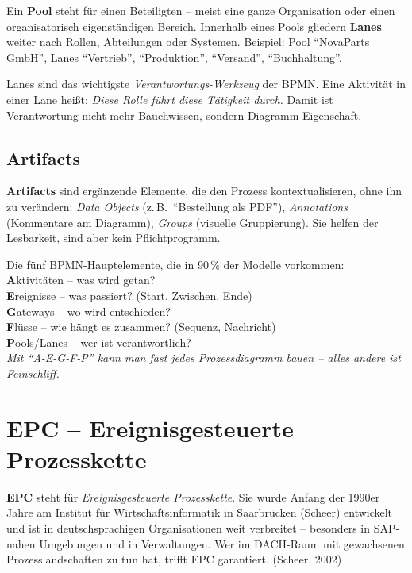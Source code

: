 \documentclass[11pt,a4paper,oneside]{article}
\newcommand{\caveatfontfallback}{\itshape}
\newcommand\caveatfont{\caveatfontfallback}%
\newcommand{\akzent}[1]{{\caveatfont\color{lpAmber}#1}}
\newcommand{\fachbegriff}[1]{\textbf{#1}}
\newcommand{\quelle}[1]{{\footnotesize\color{lpGray}(#1)}}
\begin{document}
Ein \fachbegriff{Pool} steht für einen Beteiligten -- meist eine ganze Organisation oder einen organisatorisch eigenständigen Bereich. Innerhalb eines Pools gliedern \fachbegriff{Lanes} weiter nach Rollen, Abteilungen oder Systemen. Beispiel: Pool ``NovaParts GmbH'', Lanes ``Vertrieb'', ``Produktion'', ``Versand'', ``Buchhaltung''.

Lanes sind das wichtigste \emph{Verantwortungs-Werkzeug} der BPMN. Eine Aktivität in einer Lane heißt: \emph{Diese Rolle führt diese Tätigkeit durch.} Damit ist Verantwortung nicht mehr Bauchwissen, sondern Diagramm-Eigenschaft.

\subsection{Artifacts}

\fachbegriff{Artifacts} sind ergänzende Elemente, die den Prozess kontextualisieren, ohne ihn zu verändern: \emph{Data Objects} (z.\,B.\ ``Bestellung als PDF''), \emph{Annotations} (Kommentare am Diagramm), \emph{Groups} (visuelle Gruppierung). Sie helfen der Lesbarkeit, sind aber kein Pflichtprogramm.

\begin{eselsbox}[Eselsbrücke: \akzent{A-E-G-F-P}]
Die fünf BPMN-Hauptelemente, die in 90\,\% der Modelle vorkommen:\\[2pt]
\textbf{A}ktivitäten -- was wird getan?\\
\textbf{E}reignisse -- was passiert? (Start, Zwischen, Ende)\\
\textbf{G}ateways -- wo wird entschieden?\\
\textbf{F}lüsse -- wie hängt es zusammen? (Sequenz, Nachricht)\\
\textbf{P}ools/Lanes -- wer ist verantwortlich?\\[2pt]
\emph{Mit ``A-E-G-F-P'' kann man fast jedes Prozessdiagramm bauen -- alles andere ist Feinschliff.}
\end{eselsbox}

\section{EPC -- Ereignisgesteuerte Prozesskette}

\fachbegriff{EPC} steht für \emph{Ereignisgesteuerte Prozesskette}. Sie wurde Anfang der 1990er Jahre am Institut für Wirtschaftsinformatik in Saarbrücken (Scheer) entwickelt und ist in deutschsprachigen Organisationen weit verbreitet -- besonders in SAP-nahen Umgebungen und in Verwaltungen. Wer im DACH-Raum mit gewachsenen Prozesslandschaften zu tun hat, trifft EPC garantiert. \quelle{Scheer, 2002}
\end{document}
